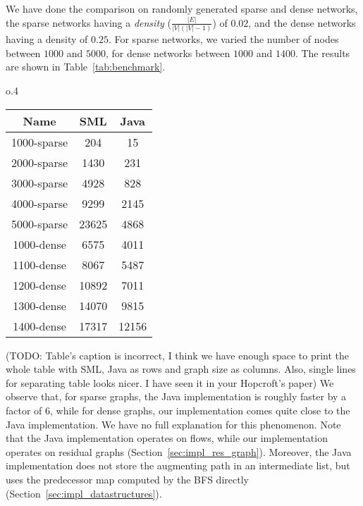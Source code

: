 \documentclass{llncs}
\begin{document}
  We have done the comparison on randomly generated sparse and dense networks, the sparse networks having a \emph{density} ($\frac{|E|}{|V|(|V| - 1)}$) of $0.02$, and the dense networks having a density of $0.25$. For sparse networks, we varied the number of nodes between $1000$ and $5000$, for dense networks between $1000$ and $1400$.
  The results are shown in Table~\ref{tab:benchmark}. 
  \begin{wrapfigure}{o}{.4\textwidth}
  \vspace{-20pt}
  \begin{center}
  \begin{tabular}{|c|c|c|}
  \hline
  Name        & SML       & Java   \\
  \hline\hline
  1000-sparse & 204       & 15     \\
  2000-sparse & 1430      & 231    \\
  3000-sparse & 4928      & 828    \\
  4000-sparse & 9299      & 2145   \\
  5000-sparse & 23625     & 4868   \\
  1000-dense  & 6575      & 4011   \\
  1100-dense  & 8067      & 5487   \\
  1200-dense  & 10892     & 7011   \\
  1300-dense  & 14070     & 9815   \\
  1400-dense  & 17317     & 12156  \\
  \hline
  \end{tabular}
  \end{center}
  \vspace{-15pt}
  \caption{Dijkstra benchmark}\label{tab:benchmark}
  \vspace{-20pt}
  \end{wrapfigure}
  
  (TODO: Table's caption is incorrect, I think we have enough space to print the whole table with SML, Java as rows and graph size as columns. Also, single lines for separating table looks nicer. I have seen it in your Hopcroft's paper) We observe that, for sparse graphs, the Java implementation is roughly faster by a factor of 6, while for dense graphs, our implementation comes quite close 
  to the Java implementation. We have no full explanation for this phenomenon. Note that the Java implementation operates on flows, while our implementation 
  operates on residual graphs (\cf Section~\ref{sec:impl_res_graph}). Moreover, the Java implementation does not store the augmenting 
  path in an intermediate list, but uses the predecessor map computed by the BFS directly (\cf Section~\ref{sec:impl_datastructures}).
\end{document}
